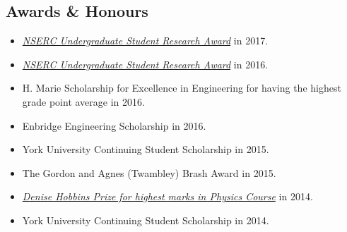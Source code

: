 \documentclass[margin, centered]{res}
\begin{document}
\begin{resume}
\section{Awards \& Honours}
\begin{itemize}[leftmargin=*]
	\item  \href{http://www.lassondeundergraduateresearch.com/electricalandcomputer#/new-page-s6yt8/}{\emph{NSERC Undergraduate Student Research Award}} in 2017.
	\item  \href{http://www.lassondeundergraduateresearch.com/lassonde#/amanpreet-walia/}{\emph{NSERC Undergraduate Student Research Award}} in 2016.
	\item
	H. Marie Scholarship for Excellence in Engineering for having the highest grade point average in 2016.
	\item
	Enbridge Engineering Scholarship in 2016.
	\item
	York University Continuing Student Scholarship in 2015.
	\item
	The Gordon and Agnes (Twambley) Brash Award in 2015.
	\item
	\href{http://physics.info.yorku.ca/undergraduate-studies/undergraduate-awards/departmental-awards/#a2}{\emph{Denise Hobbins Prize for highest marks in Physics Course}} in 2014.
	\item
	York University Continuing Student Scholarship in 2014.
	
	
\end{itemize}

\end{resume}
\end{document}
